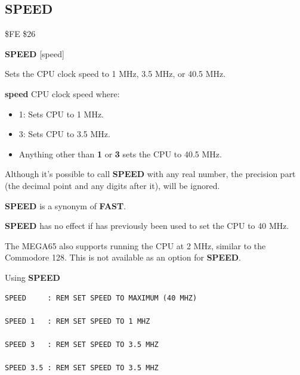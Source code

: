 
\newpage
\subsection{SPEED}
\begin{description}[leftmargin=2cm,style=nextline]
\item [Token:]    \$FE \$26

\item [Format:]   {\bf SPEED} [speed]

\item [Usage:]    Sets the CPU clock speed to 1 MHz, 3.5 MHz, or 40.5 MHz.

                  {\bf speed} CPU clock speed where:
                  \begin{itemize}
                     \item 1: Sets CPU to 1 MHz.
                     \item 3: Sets CPU to 3.5 MHz.
                     \item Anything other than {\bf 1} or {\bf 3} sets the CPU to 40.5 MHz.
                  \end{itemize}

\item [Remarks:]  Although it's possible to call {\bf SPEED} with any real number, the precision part (the decimal point and any digits after it), will be ignored.

                  {\bf SPEED} is a synonym of {\bf FAST}.

                  {\bf SPEED} has no effect if  has previously been used to set the CPU to 40 MHz.

                  The MEGA65 also supports running the CPU at 2 MHz, similar to the Commodore 128. This is not available as an option for {\bf SPEED}.

\item [Examples:] Using {\bf SPEED}

\begin{tcolorbox}[colback=black,coltext=white]
\verbatimfont{\codefont}
\begin{verbatim}
SPEED     : REM SET SPEED TO MAXIMUM (40 MHZ)

SPEED 1   : REM SET SPEED TO 1 MHZ

SPEED 3   : REM SET SPEED TO 3.5 MHZ

SPEED 3.5 : REM SET SPEED TO 3.5 MHZ
\end{verbatim}
\end{tcolorbox}
\end{description}

